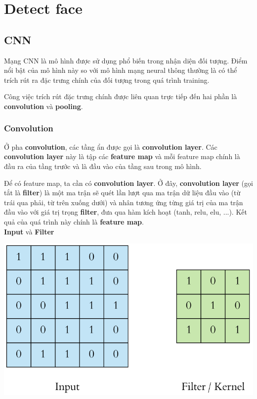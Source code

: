 \documentclass[12pt]{extreport}
\begin{document}
\section{Detect face}

\subsection{CNN}
Mạng CNN là mô hình được sử dụng phổ biến trong nhận diện đối tượng. Điểm nổi bật của mô hình này so với mô hình mạng neural thông thường là có thể trích rút ra đặc trưng chính của đối tượng trong quá trình training. 

Công việc trích rút đặc trưng chính được liên quan trực tiếp đến hai phần là \textbf{convolution} và \textbf{pooling}.

\subsubsection{Convolution}
Ở pha \textbf{convolution}, các tầng ẩn được gọi là \textbf{convolution layer}. Các \textbf{convolution layer} này là tập các \textbf{feature map} và mỗi feature map chính là đầu ra của tầng trước và là đầu vào của tầng sau trong mô hình. 

Để có feature map, ta cần có \textbf{convolution layer}. Ở đây, \textbf{convolution layer} (gọi tắt là \textbf{filter}) là một ma trận sẽ quét lần lượt qua ma trận dữ liệu đầu vào (từ trái qua phải, từ trên xuống dưới) và nhân tương ứng từng giá trị của ma trận đầu vào với giá trị trọng \textbf{filter}, đưa qua hàm kích hoạt (tanh, relu, elu, ...). Kết quả của quá trình này chính là \textbf{feature map}.\\

\textbf{Input} và \textbf{Filter}
\begin{center}
\includegraphics[scale=0.5]{Image/Convolution_input}
\end{center}
\end{document}
